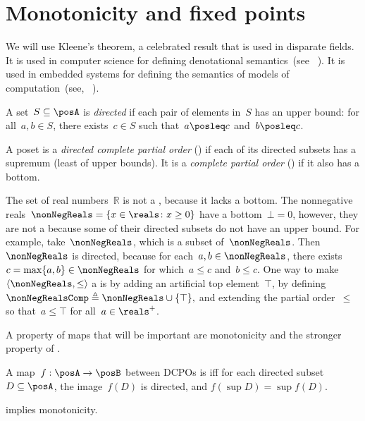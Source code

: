 \section{Monotonicity and fixed points}
\label{sec:Monotonicity-and-fixed}

We will use Kleene's theorem, a celebrated result that is used in
disparate fields. It is used in computer science for defining denotational
semantics~(see \eg~\cite{manes86}). It is used in embedded systems
for defining the semantics of models of computation~(see, \eg~\cite{lee10}).

\begin{definition}
  A set~$S\subseteq\posA$ is \emph{directed} if each pair of elements
  in~$S$ has an upper bound: for all~$a,b\in S$, there exists~$c\in S$
  such that~$a\posleq c$ and~$b\posleq c$.
\end{definition}

\begin{definition}[Completeness]
  \label{def:cpo}A poset is a \emph{directed complete partial order}
  (\DCPO) if each of its directed subsets has a supremum (least of
  upper bounds). It is a \emph{complete partial order} (\CPO) if it
  also has a bottom.

\end{definition}
\begin{example}
  \label{exa:Rcomp}The set of real numbers~$\mathbb{R}$ is not
  a \CPO, because it lacks a bottom. The nonnegative reals~$\nonNegReals=\{x\in\reals \colon x\geq0\}$
  have a bottom~$\bot=0$, however, they are not a \DCPO because some
  of their directed subsets do not have an upper bound. For example,
  take~$\nonNegReals$, which is a subset of~$\nonNegReals$. Then~$\nonNegReals$
  is directed, because for each~$a,b\in\nonNegReals$, there exists~$c=\max\{a,b\}\in\nonNegReals$
  for which~$a\leq c$ and~$b\leq c$. One way to make~$\left\langle \nonNegReals,\leq\right\rangle $
  a \CPO is by adding an artificial top element~$\top$, by defining~$\nonNegRealsComp\triangleq\nonNegReals\cup\{\top\},$
  and extending the partial order~$\leq$ so that~$a\leq\top$ for
  all~$a\in\reals^{+}$.
\end{example}

A property of maps that will be important are monotonicity and
the stronger property of \scottcontinuity.

\begin{definition}[\scottcontinuity]
  \label{def:scott}A map~$f:\posA\rightarrow\posB$ between DCPOs
  is\textbf{ }\emph{\scottcontinuous{}}\textbf{ }iff for each directed
  subset~$D\subseteq\posA$, the image~$f(D)$ is directed, and $f(\sup D)=\sup f(D).$
\end{definition}
\begin{remark}
  \scottcontinuity implies monotonicity.
\end{remark}

